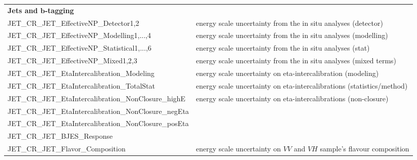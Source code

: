 \begin{table}
{\begin{tabular}{ll}
{\bfseries Jets and $\bm{b}$-tagging}&\\
JET\_CR\_JET\_EffectiveNP\_Detector1,2 & energy scale uncertainty from the in situ analyses (detector) \\%
JET\_CR\_JET\_EffectiveNP\_Modelling1,...,4 & energy scale uncertainty from the in situ analyses (modelling) \\%
JET\_CR\_JET\_EffectiveNP\_Statistical1,...,6 & energy scale uncertainty from the in situ analyses (stat) \\%
JET\_CR\_JET\_EffectiveNP\_Mixed1,2,3 & energy scale uncertainty from the in situ analyses (mixed terms) \\%
JET\_CR\_JET\_EtaIntercalibration\_Modeling & energy scale uncertainty on eta-intercalibration (modeling)\\%
JET\_CR\_JET\_EtaIntercalibration\_TotalStat & energy scale uncertainty on eta-intercalibrations (statistics/method) \\%
JET\_CR\_JET\_EtaIntercalibration\_NonClosure\_highE & \multirow{3}{*}{energy scale uncertainty on eta-intercalibrations (non-closure)} \\%
JET\_CR\_JET\_EtaIntercalibration\_NonClosure\_negEta &\\%
JET\_CR\_JET\_EtaIntercalibration\_NonClosure\_posEta &\\%
JET\_CR\_JET\_BJES\_Response &  \\%
JET\_CR\_JET\_Flavor\_Composition & energy scale uncertainty on $VV$ and $VH$ sample's flavour composition \\%

\end{tabular}}
\end{table}
